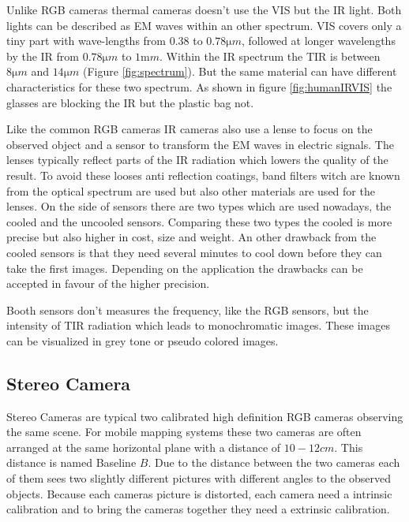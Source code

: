 Unlike RGB cameras thermal cameras doesn't use the \ac{VIS} but the \ac{IR} light.
Both lights can be described as \ac{EM} waves within an other spectrum.
\ac{VIS} covers only a tiny part with wave-lengths from $0.38$ to $0.78\si{\micro m}$, followed at longer wavelengths by the \ac{IR} from $0.78\si{\micro m}$ to $1\si{\milli m}$.
Within the \ac{IR} spectrum the \ac{TIR} is between $8\si{\micro m}$ and $14\si{\micro m}$\cite{Vollmer2017} (Figure \ref{fig:spectrum}).
But the same material can have different characteristics for these two spectrum.
As shown in figure \ref{fig:humanIRVIS} the glasses are blocking the \ac{IR} but the plastic bag not.

Like the common RGB cameras \ac{IR} cameras also use a lense to focus on the observed object and a sensor to transform the \ac{EM} waves in electric signals.
The lenses typically reflect parts of the \ac{IR} radiation which lowers the quality of the result.
To avoid these looses anti reflection coatings, band filters witch are known from the optical spectrum are used\cite{Vollmer2017} but also other materials are used for the lenses.
On the side of sensors there are two types which are used nowadays, the cooled and the uncooled sensors.
Comparing these two types the cooled is more precise but also higher in cost, size and weight.
An other drawback from the cooled sensors is that they need several minutes to cool down before they can take the first images.
Depending on the application the drawbacks can be accepted in favour of the higher precision.

Booth sensors don't measures the frequency, like the RGB sensors, but the intensity of \ac{TIR} radiation which leads to monochromatic images.
These images can be visualized in grey tone or pseudo colored images.

\subsection{Stereo Camera}\label{ssec:stereoCamera}
Stereo Cameras are typical two calibrated high definition RGB cameras observing the same scene.
For mobile mapping systems these two cameras are often arranged at the same horizontal plane with a distance of $10-12\si{cm}$.
This distance is named Baseline $B$.
Due to the distance between the two cameras each of them sees two slightly different pictures with different angles to the observed objects.
Because each cameras picture is distorted, each camera need a intrinsic calibration and to bring the cameras together they need a extrinsic calibration. 

